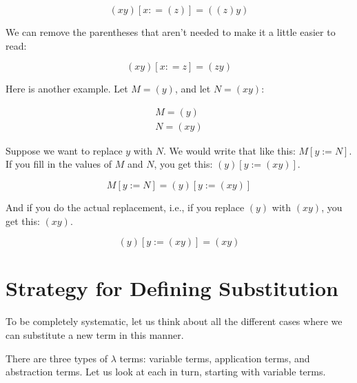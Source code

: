 \documentclass{book}
\numberwithin{equation}{chapter}
\begin{document}
\begin{equation}
(x y)[x: = (z)] = ((z) y)
\end{equation}

\noindent
We can remove the parentheses that aren't needed to make it a little easier to read:

\begin{equation}
(x y)[x: = z] = (z y)
\end{equation}

\noindent
Here is another example. Let $M = (y)$, and let $N = (x y)$:

\begin{align}
M = (y) \\
N = (x y)
\end{align}

\noindent
Suppose we want to replace $y$ with $N$. We would write that like this: $M[y := N]$. If you fill in the values of $M$ and $N$, you get this: $(y)[y := (x y)]$.

\begin{equation}
M[y := N] = (y)[y := (x y)]
\end{equation}

\noindent
And if you do the actual replacement, i.e., if you replace $(y)$ with $(x y)$, you get this: $(x y)$.

\begin{equation}
(y)[y := (x y)] = (x y)
\end{equation}


\section{Strategy for Defining Substitution}

To be completely systematic, let us think about all the different cases where we can substitute a new term in this manner. 

There are three types of $\lambda$ terms: variable terms, application terms, and abstraction terms. Let us look at each in turn, starting with variable terms.



\end{document}
